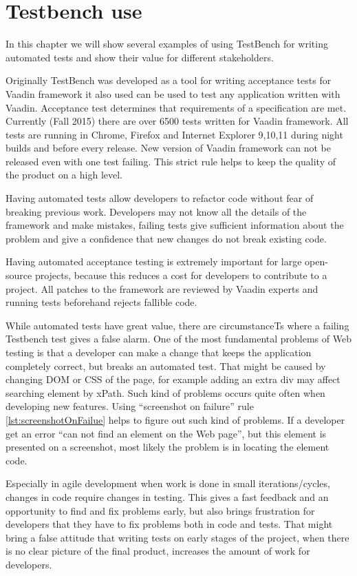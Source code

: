 \chapter{Testbench use}
\label{ch:testbenchuse}
In this chapter we will show several examples of using TestBench for writing
automated tests and show their value for different stakeholders. 

Originally TestBench was developed as a tool for writing acceptance tests for 
Vaadin framework it also used can be used to test any application written with
Vaadin. Acceptance test determines that requirements of a specification are met.
Currently (Fall 2015) there are over 6500 tests written for Vaadin framework.
All tests are running in Chrome, Firefox and Internet Explorer 9,10,11 during
night builds and before every release. New version of Vaadin framework can
not be released even with one test failing. This strict rule helps to keep
the quality of the product on a high level.

Having automated tests allow developers to refactor code without fear of
breaking previous work. Developers may not know all the details of the framework and make mistakes,
 failing tests give sufficient information about the problem 
 and give a confidence that new changes do not break existing code.
   
 Having automated acceptance testing is extremely important for large
 open-source projects, because this reduces a cost for developers to contribute
 to a project.  All patches to the framework are reviewed by Vaadin experts and
 running tests beforehand rejects fallible code.

 While automated tests have great value, there are circumstanceTs
 where a failing Testbench test gives a false alarm. One of the most fundamental
  problems of Web testing is that a developer can make a change that keeps
   the application completely correct, but breaks an automated test.   
That might be caused by changing DOM or CSS of the page, for example adding
an extra div may affect searching element by xPath. Such kind of problems 
occurs quite often when developing new features. Using ``screenshot on failure''
rule \ref{lst:screenshotOnFailue} helps to figure out such kind of problems. If
a developer get an error ``can not find an element on the Web page'', 
but this element is presented on a screenshot, most likely the problem is in
locating the element code.

Especially in agile development when work is done in small iterations/cycles, 
changes in code require changes in testing. This gives a fast feedback and
 an opportunity to find and fix problems early, but also brings frustration
for developers that they have to fix problems both in code and tests. 
That might bring a false attitude that writing tests on early stages of the project,
 when there is no clear picture of the final product,
 increases the amount of work for developers. 
 
